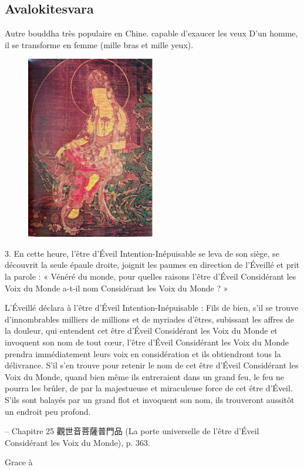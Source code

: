 \subsection{Avalokitesvara} Autre bouddha très populaire en Chine. capable d'exaucer les veux D'un homme, il se transforme en femme (mille bras et mille yeux). 

\begin{figure}
    \centering
        \includegraphics[width=0.5\textwidth]{ConfucianismeTaoismeBouddhismeChinois/guanyin.jpg}

    \label{fig:enter-label}
\end{figure}


\begin{singlequote}
    3.	En cette heure, l’être d’Éveil Intention-Inépuisable se leva de son siège, se découvrit la seule épaule droite, joignit les paumes en direction de l’Éveillé et prit la parole : « Vénéré du monde, pour quelles raisons l’être d’Éveil Considérant les Voix du Monde a-t-il nom Considérant les Voix du Monde ? »

L’Éveillé déclara à l’être d’Éveil Intention-Inépuisable :
Fils de bien, s’il se trouve d’innombrables milliers de millions et de myriades d’êtres, subissant les affres de la douleur, qui entendent cet être d’Éveil Considérant les Voix du Monde et invoquent son nom de tout cœur, l’être d’Éveil Considérant les Voix du Monde prendra immédiatement leurs voix en considération et ils obtiendront tous la délivrance. S’il s’en trouve pour retenir le nom de cet être d’Éveil Considérant les Voix du Monde, quand bien même ils entreraient dans un grand feu, le feu ne pourra les brûler, de par la majestueuse et miraculeuse force de cet être d’Éveil.
S’ils sont balayés par un grand flot et invoquent son nom, ils trouveront aussitôt un endroit peu profond.



-- Chapitre 25 觀世音菩薩普門品 (La porte universelle de l’être d’Éveil Considérant les
Voix du Monde), p. 363.
\end{singlequote}
Grace à 


